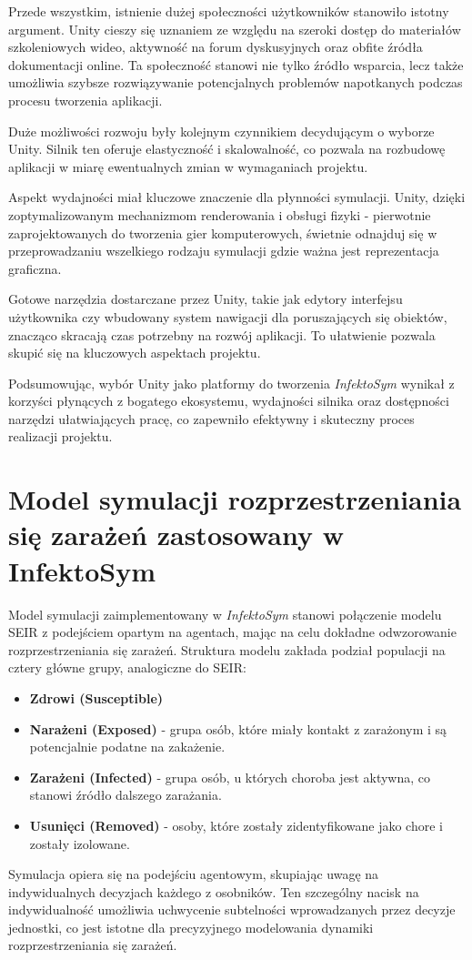 Przede wszystkim, istnienie dużej społeczności użytkowników stanowiło istotny argument. Unity cieszy się uznaniem ze względu na szeroki dostęp do materiałów szkoleniowych wideo, aktywność na forum dyskusyjnych oraz obfite źródła dokumentacji online. Ta społeczność stanowi nie tylko źródło wsparcia, lecz także umożliwia szybsze rozwiązywanie potencjalnych problemów napotkanych podczas procesu tworzenia aplikacji.

Duże możliwości rozwoju były kolejnym czynnikiem decydującym o wyborze Unity. Silnik ten oferuje elastyczność i skalowalność, co pozwala na rozbudowę aplikacji w miarę ewentualnych zmian w wymaganiach projektu.

Aspekt wydajności miał kluczowe znaczenie dla płynności symulacji. Unity, dzięki zoptymalizowanym mechanizmom renderowania i obsługi fizyki - pierwotnie zaprojektowanych do tworzenia gier komputerowych, świetnie odnajduj się w przeprowadzaniu wszelkiego rodzaju symulacji gdzie ważna jest reprezentacja graficzna.

Gotowe narzędzia dostarczane przez Unity, takie jak edytory interfejsu użytkownika czy wbudowany system nawigacji dla poruszających się obiektów, znacząco skracają czas potrzebny na rozwój aplikacji. To ułatwienie pozwala skupić się na kluczowych aspektach projektu.

Podsumowując, wybór Unity jako platformy do tworzenia \textit{InfektoSym} wynikał z korzyści płynących z bogatego ekosystemu, wydajności silnika oraz dostępności narzędzi ułatwiających pracę, co zapewniło efektywny i skuteczny proces realizacji projektu.
\section{\textbf{Model symulacji rozprzestrzeniania się zarażeń zastosowany w InfektoSym}}

Model symulacji zaimplementowany w \textit{InfektoSym} stanowi połączenie modelu SEIR z podejściem opartym na agentach, mając na celu dokładne odwzorowanie rozprzestrzeniania się zarażeń. Struktura modelu zakłada podział populacji na cztery główne grupy, analogiczne do SEIR:
\begin{itemize}
	\item \textbf{Zdrowi (Susceptible)}
	\item \textbf{Narażeni (Exposed)} - grupa osób, które miały kontakt z zarażonym i są potencjalnie podatne na zakażenie.
	\item \textbf{Zarażeni (Infected)} - grupa osób, u których choroba jest aktywna, co stanowi źródło dalszego zarażania.
	\item \textbf{Usunięci (Removed)} - osoby, które zostały zidentyfikowane jako chore i zostały izolowane.
\end{itemize}
Symulacja opiera się na podejściu agentowym, skupiając uwagę na indywidualnych decyzjach każdego z osobników. Ten szczególny nacisk na indywidualność umożliwia uchwycenie subtelności wprowadzanych przez decyzje jednostki, co jest istotne dla precyzyjnego modelowania dynamiki rozprzestrzeniania się zarażeń.

